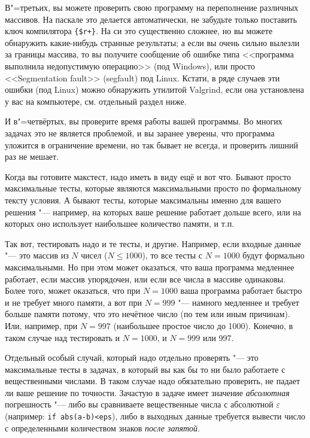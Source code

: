 \documentclass[a4paper,10pt]{problems}
\begin{document}
В"=третьих, вы можете проверить свою программу на переполнение различных массивов. 
На паскале это делается автоматически, не забудьте только поставить ключ компилятора \verb`{$r+}`.
На си это существенно сложнее, но вы можете обнаружить какие-нибудь странные результаты;
а если вы очень сильно вылезли за границы массива, то вы получите сообщение об ошибке типа <<программа выполнила недопустимую операцию>> (под Windows),
или просто <<Segmentation fault>> (segfault) под Linux. 
Кстати, в ряде случаев эти ошибки (под Linux) можно обнаружить утилитой Valgrind, если она установлена у вас на компьютере, см. отдельный раздел ниже.

И в"=четвёртых, вы проверите время работы вашей программы. 
Во многих задачах это не является проблемой, и вы заранее уверены, что программа уложится в ограничение времени, 
но так бывает не всегда, и проверить лишний раз не мешает.

Когда вы готовите макстест, надо иметь в виду ещё и вот что. 
Бывают просто максимальные тесты, которые являются максимальными просто по формальному тексту условия.
А бывают тесты, которые максимальны именно для вашего решения "--- например, на которых ваше решение работает дольше всего,
или на которых оно использует наибольшее количество памяти, и т.п.

Так вот, тестировать надо и те тесты, и другие. 
Например, если входные данные "--- это массив из $N$ чисел ($N\leq 1000$), то все тесты с $N=1000$ будут формально максимальными.
Но при этом может оказаться, что ваша программа медленнее работает, если массив упорядочен, или если все числа в массиве одинаковы.
Более того, может оказаться, что при $N=1000$ ваша программа работает быстро и не требует много памяти, а вот при $N=999$ "--- 
намного медленнее и требует больше памяти потому, что это нечётное число (по тем или иным причинам). Или, например, при $N=997$ 
(наибольшее простое число до 1000). Конечно, в таком случае над тестировать и $N=1000$, и $N=999$ или 997.

Отдельный особый случай, который надо отдельно проверять "--- 
это максимальные тесты в задачах, в который вы как бы то ни было работаете с вещественными числами.
В таком случае надо обязательно проверить, не падает ли ваше решение по точности.
Зачастую в задаче имеет значение \textit{абсолютная} погрешность
"--- либо вы сравниваете вещественные числа с абсолютной $\varepsilon$ (например:
\verb`if abs(a-b)<eps`), либо в выходных данные требуется вывести число с определенными 
количеством знаков \textit{после запятой}. 
\end{document}
